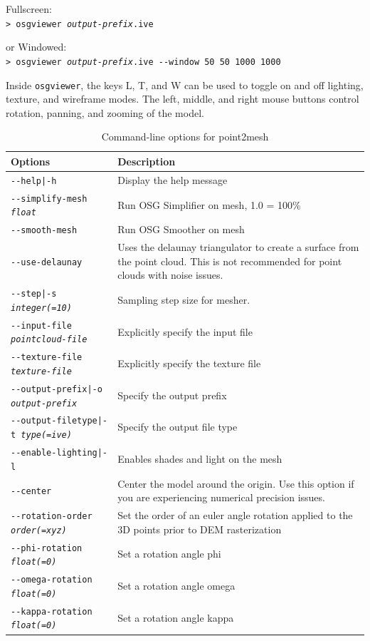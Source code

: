 \hspace*{2em}Fullscreen:\\
\hspace*{2em}\texttt{> osgviewer \textit{output-prefix}.ive}

\hspace*{2em}or Windowed:\\
\hspace*{2em}\texttt{> osgviewer \textit{output-prefix}.ive -\/-window 50 50 1000 1000}

Inside \texttt{osgviewer}, the keys L, T, and W can be used to toggle on
and off lighting, texture, and wireframe modes.  The left, middle, and
right mouse buttons control rotation, panning, and zooming of the
model.

\begin{longtable}{|l|p{10cm}|}
\caption{Command-line options for point2mesh}
\label{tbl:point2mesh}
\endfirsthead
\endhead
\endfoot
\endlastfoot
\hline
Options & Description \\ \hline \hline
\texttt{-\/-help|-h} & Display the help message\\ \hline
\texttt{-\/-simplify-mesh \textit{float}} & Run OSG Simplifier on mesh, 1.0 = 100\% \\ \hline
\texttt{-\/-smooth-mesh} & Run OSG Smoother on mesh \\ \hline
\texttt{-\/-use-delaunay} & Uses the delaunay triangulator to create a surface from the point cloud. This is not recommended for point clouds with noise issues. \\ \hline
\texttt{-\/-step|-s \textit{integer(=10)}} & Sampling step size for mesher. \\ \hline
\texttt{-\/-input-file \textit{pointcloud-file}} & Explicitly specify the input file \\ \hline
\texttt{-\/-texture-file \textit{texture-file}} & Explicitly specify the texture file \\ \hline
\texttt{-\/-output-prefix|-o \textit{output-prefix}} & Specify the output prefix \\ \hline
\texttt{-\/-output-filetype|-t \textit{type(=ive)}} & Specify the output file type \\ \hline
\texttt{-\/-enable-lighting|-l} & Enables shades and light on the mesh \\ \hline
\texttt{-\/-center} & Center the model around the origin. Use this option if you are experiencing numerical precision issues. \\ \hline
\texttt{-\/-rotation-order \textit{order(=xyz)}} & Set the order of an euler angle rotation applied to the 3D points prior to DEM rasterization \\ \hline
\texttt{-\/-phi-rotation \textit{float(=0)}} & Set a rotation angle phi \\ \hline
\texttt{-\/-omega-rotation \textit{float(=0)}} & Set a rotation angle omega \\ \hline
\texttt{-\/-kappa-rotation \textit{float(=0)}} & Set a rotation angle kappa \\ \hline
\end{longtable}

